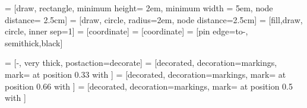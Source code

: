  = [draw, rectangle, minimum height= 2em, minimum width = 5em, node distance= 2.5cm]
 = [draw, circle, radius=2em, node distance=2.5cm]
 = [fill,draw, circle, inner sep=1]
 = [coordinate]
 = [coordinate]
 = [pin edge={to-, semithick,black}]

\usetikzlibrary{decorations.markings}
 = [-, very thick, postaction={decorate}] %
 = [decorated, decoration={markings, mark= at position 0.33 with {\arrow{>}}}]
 = [decorated, decoration={markings, mark= at position 0.66 with {\arrow{>}}}]
 = [decorated, decoration={markings, mark= at position 0.5 with {\arrow{>}}}]